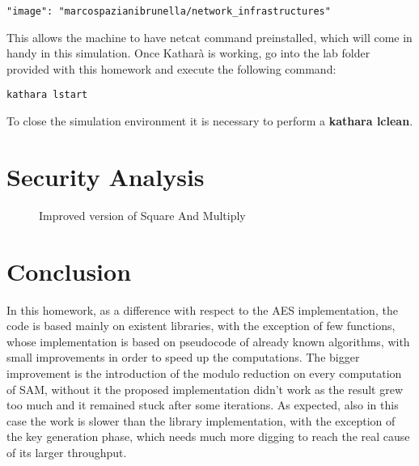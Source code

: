 \documentclass{article}
\begin{document}
\begin{lstlisting}[breaklines]
	"image": "marcospazianibrunella/network_infrastructures"
\end{lstlisting}

This allows the machine to have netcat command preinstalled, which will come in handy in this simulation. Once Katharà is working, go into the lab folder provided with this homework and execute the following command:  

\begin{lstlisting}[breaklines]
	kathara lstart
\end{lstlisting}

To close the simulation environment it is necessary to perform a \textbf{kathara lclean}.



\section{Security Analysis}
\label{sec:secAn}

\begin{figure}[H]
	\centering
	\caption{Improved version of Square And Multiply}
	\label{fig:sam}
\end{figure}


\section{Conclusion}

In this homework, as a difference with respect to the AES implementation, the code is based mainly on existent libraries, with the exception of few functions, whose implementation is based on pseudocode of already known algorithms, with small improvements in order to speed up the computations. The bigger improvement is the introduction of the modulo reduction on every computation of SAM, without it the proposed implementation didn't work as the result grew too much and it remained stuck after some iterations. As expected, also in this case the work is slower than the library implementation, with the exception of the key generation phase, which needs much more digging to reach the real cause of its larger throughput.






\end{document}
